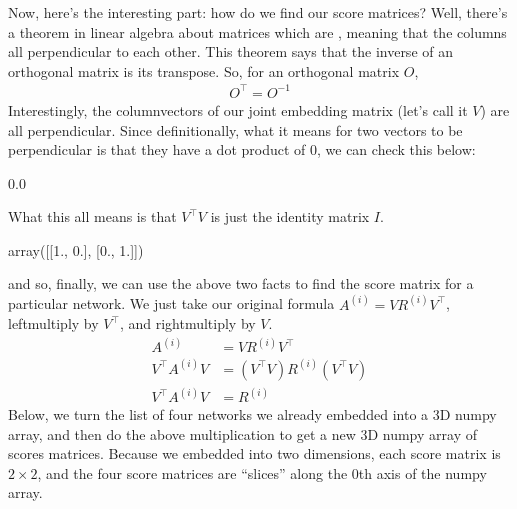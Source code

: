 \documentclass[letterpaper,10pt,english]{jupyterBook}
\begin{document}
\sphinxAtStartPar
Now, here’s the interesting part: how do we find our score matrices? Well, there’s a theorem in linear algebra about matrices which are , meaning that the columns all perpendicular to each other. This theorem says that the inverse of an orthogonal matrix is its transpose. So, for an orthogonal matrix \(O\),
\begin{align*}
    O^\top = O^{-1}
\end{align*}
\sphinxAtStartPar
Interestingly, the column\sphinxhyphen{}vectors of our joint embedding matrix (let’s call it \(V\)) are all perpendicular. Since definitionally, what it means for two vectors to be perpendicular is that they have a dot product of 0, we can check this below:

\begin{sphinxVerbatim}[commandchars=\\\{\}]
  

\PYG{p}{[} \PYG{p}{]}  \PYG{p}{[} \PYG{p}{]}
\end{sphinxVerbatim}

\begin{sphinxVerbatim}[commandchars=\\\{\}]
0.0
\end{sphinxVerbatim}

\sphinxAtStartPar
What this all means is that \(V^\top V\) is just the identity matrix \(I\).

\begin{sphinxVerbatim}[commandchars=\\\{\}]
\end{sphinxVerbatim}

\begin{sphinxVerbatim}[commandchars=\\\{\}]
array([[1., 0.],
       [0., 1.]])
\end{sphinxVerbatim}

\sphinxAtStartPar
and so, finally, we can use the above two facts to find the score matrix for a particular network. We just take our original formula \(A^{(i)} = VR^{(i)} V^\top\), left\sphinxhyphen{}multiply by \(V^\top\), and right\sphinxhyphen{}multiply by \(V\).
\begin{align*}
    A^{(i)} &= VR^{(i)} V^\top \\
    V^{\top} A^{(i)} V &= (V^\top V) R^{(i)} (V^\top V) \\
    V^\top A^{(i)} V &= R^{(i)} 
\end{align*}
\sphinxAtStartPar
Below, we turn the list of four networks we already embedded into a 3\sphinxhyphen{}D numpy array, and then do the above multiplication to get a new 3D numpy array of scores matrices. Because we embedded into two dimensions, each score matrix is \(2 \times 2\), and the four score matrices are “slices” along the 0th axis of the numpy array.
\end{document}
